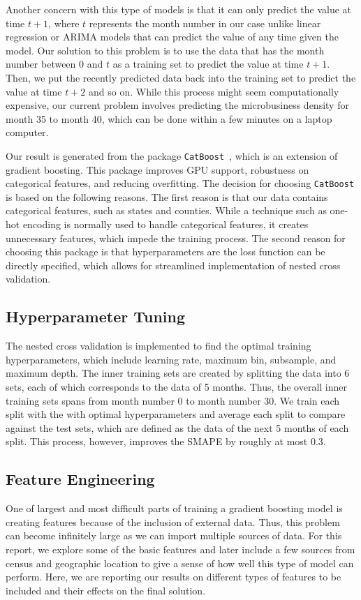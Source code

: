 \documentclass[prl,aps,superscriptaddress,twocolumn,10pt,nolongbibliography]{revtex4-2}
\begin{document}
Another concern with this type of models is that it can only predict the value at time $t + 1$, where $t$ represents the month number in our case unlike linear regression or ARIMA models that can predict the value of any time given the model. 
Our solution to this problem is to use the data that has the month number between $0$ and $t$ as a training set to predict the value at time $t + 1$.
Then, we put the recently predicted data back into the training set to predict the value at time $t + 2$ and so on.
While this process might seem computationally expensive, our current problem involves predicting the microbusiness density for month 35 to month 40, which can be done within a few minutes on a laptop computer.

Our result is generated from the package \lstinline{CatBoost}~\cite{prokhorenkova2017catboost,dorogush2018catboost}, which is an extension of gradient boosting. 
This package improves GPU support, robustness on categorical features, and reducing overfitting.
The decision for choosing \lstinline{CatBoost} is based on the following reasons. 
The first reason is that our data contains categorical features, such as states and counties. 
While a technique such as one-hot encoding is normally used to handle categorical features, it creates unnecessary features, which impede the training process.
The second reason for choosing this package is that hyperparameters are the loss function can be directly specified, which allows for streamlined implementation of nested cross validation.

\subsection{Hyperparameter Tuning}
The nested cross validation is implemented to find the optimal training hyperparameters, which include learning rate, maximum bin, subsample, and maximum depth. 
The inner training sets are created by splitting the data into 6 sets, each of which corresponds to the data of 5 months. 
Thus, the overall inner training sets spans from month number 0 to month number 30.
We train each split with the with optimal hyperparameters and average each split to compare against the test sets, which are defined as the data of the next 5 months of each split.
This process, however, improves the SMAPE by roughly at most 0.3.

\subsection{Feature Engineering}
One of largest and most difficult parts of training a gradient boosting model is creating features because of the inclusion of external data.
Thus, this problem can become infinitely large as we can import multiple sources of data. 
For this report, we explore some of the basic features and later include a few sources from census and geographic location to give a sense of how well this type of model can perform.
Here, we are reporting our results on different types of features to be included and their effects on the final solution.
\end{document}
